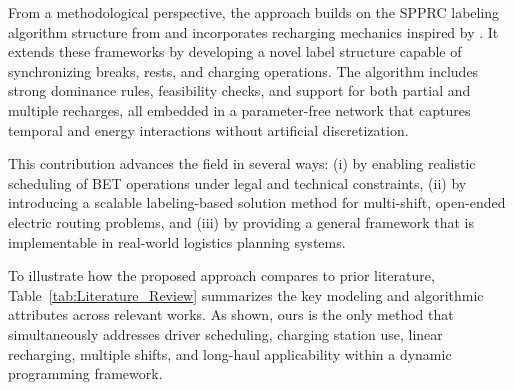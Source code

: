 \documentclass[trsc,dblanonrev]{informs4}
\begin{document}
From a methodological perspective, the approach builds on the SPPRC labeling algorithm structure from \citet{goel2017exact} and incorporates recharging mechanics inspired by \citet{desaulniers2016exact}. It extends these frameworks by developing a novel label structure capable of synchronizing breaks, rests, and charging operations. The algorithm includes strong dominance rules, feasibility checks, and support for both partial and multiple recharges, all embedded in a parameter-free network that captures temporal and energy interactions without artificial discretization.

This contribution advances the field in several ways: (i) by enabling realistic scheduling of BET operations under legal and technical constraints, (ii) by introducing a scalable labeling-based solution method for multi-shift, open-ended electric routing problems, and (iii) by providing a general framework that is implementable in real-world logistics planning systems.

To illustrate how the proposed approach compares to prior literature, Table~\ref{tab:Literature_Review} summarizes the key modeling and algorithmic attributes across relevant works. As shown, ours is the only method that simultaneously addresses driver scheduling, charging station use, linear recharging, multiple shifts, and long-haul applicability within a dynamic programming framework.
\end{document}
